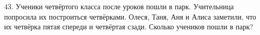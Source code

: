 43. Ученики четвёртого класса после уроков пошли в парк. Учительница попросила их построиться четвёрками. Олеся, Таня, Аня и Алиса заметили, что их четвёрка пятая спереди и четвёртая сзади. Сколько учеников пошли в парк?\\
